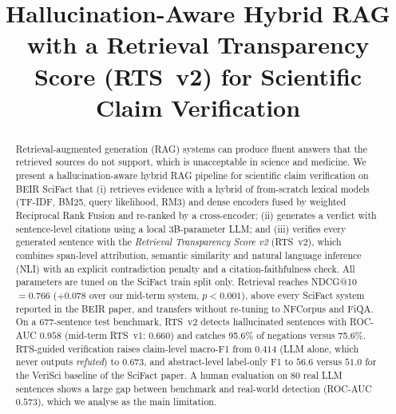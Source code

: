 \documentclass[conference]{IEEEtran}
\begin{document}
\title{Hallucination-Aware Hybrid RAG with a Retrieval Transparency Score (RTS~v2) for Scientific Claim Verification}

\author{
}

\maketitle

\begin{abstract}
Retrieval-augmented generation (RAG) systems can produce fluent answers that the retrieved sources do not support, which
is unacceptable in science and medicine. We present a hallucination-aware hybrid RAG pipeline for scientific claim
verification on BEIR SciFact that (i) retrieves evidence with a hybrid of from-scratch lexical models (TF-IDF, BM25,
query likelihood, RM3) and dense encoders fused by weighted Reciprocal Rank Fusion and re-ranked by a cross-encoder;
(ii) generates a verdict with sentence-level citations using a local 3B-parameter LLM; and (iii) verifies every generated
sentence with the \emph{Retrieval Transparency Score v2} (RTS~v2), which combines span-level attribution, semantic
similarity and natural language inference (NLI) with an explicit contradiction penalty and a citation-faithfulness check.
All parameters are tuned on the SciFact train split only. Retrieval reaches NDCG@10 $=0.766$ ($+0.078$ over our mid-term
system, $p<0.001$), above every SciFact system reported in the BEIR paper, and transfers without re-tuning to NFCorpus and
FiQA. On a 677-sentence test benchmark, RTS~v2 detects hallucinated sentences with ROC-AUC $0.958$ (mid-term RTS~v1:
$0.660$) and catches 95.6\% of negations versus 75.6\%. RTS-guided verification raises claim-level macro-F1 from $0.414$
(LLM alone, which never outputs \emph{refuted}) to $0.673$, and abstract-level label-only F1 to $56.6$ versus $51.0$ for
the VeriSci baseline of the SciFact paper. A human evaluation on 80 real LLM sentences shows a large gap between benchmark
and real-world detection (ROC-AUC $0.573$), which we analyse as the main limitation.
\end{abstract}
\end{document}
